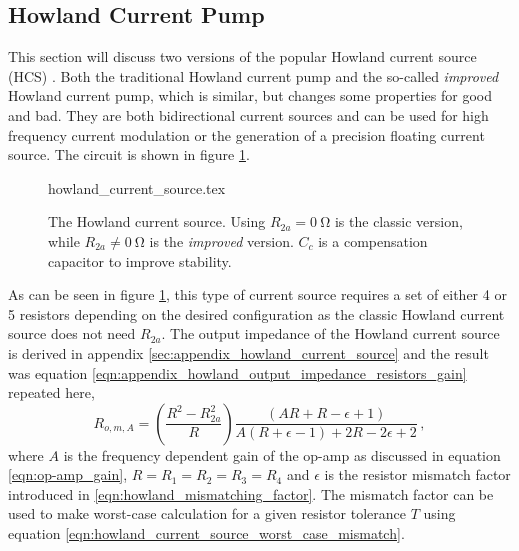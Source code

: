 \subsection{Howland Current Pump}%
\label{sec:howland_current_source}
This section will discuss two versions of the popular Howland current source (HCS) \cite{howland_current_source}. Both the traditional Howland current pump and the so-called \textit{improved} Howland current pump, which is similar, but changes some properties for good and bad. They are both bidirectional current sources and can be used for high frequency current modulation or the generation of a precision floating current source. The circuit is shown in figure \ref{fig:howland_current_source}.
\begin{figure}[ht]
    \centering
        {howland_current_source.tex}
    \caption{The Howland current source. Using $R_{2a} = \qty{0}{\ohm}$ is the classic version, while $R_{2a} \neq \qty{0}{\ohm}$ is the \textit{improved} version. $C_c$ is a compensation capacitor to improve stability.}
    \label{fig:howland_current_source}
\end{figure}

As can be seen in figure \ref{fig:howland_current_source}, this type of current source requires a set of either \num{4} or \num{5} resistors depending on the desired configuration as the classic Howland current source does not need $R_{2a}$. The output impedance of the Howland current source is derived in appendix \ref{sec:appendix_howland_current_source} and the result was equation \ref{eqn:appendix_howland_output_impedance_resistors_gain} repeated here,
\begin{equation}
    R_{o,m,A} = \left(\frac{R^2 - R_{2a}^2}{R}\right) \frac{\left(A R + R - \epsilon + 1\right)}{A \left(R + \epsilon - 1\right) + 2 R - 2 \epsilon + 2}\,,\label{eqn:howland_output_impedance_resistors_gain}
\end{equation}
where $A$ is the frequency dependent gain of the op-amp as discussed in equation \ref{eqn:op-amp_gain}, $R = R_1 = R_2 = R_3 = R_4$ and $\epsilon$ is the resistor mismatch factor introduced in \ref{eqn:howland_mismatching_factor}. The mismatch factor can be used to make worst-case calculation for a given resistor tolerance $T$ using equation \ref{eqn:howland_current_source_worst_case_mismatch}.

